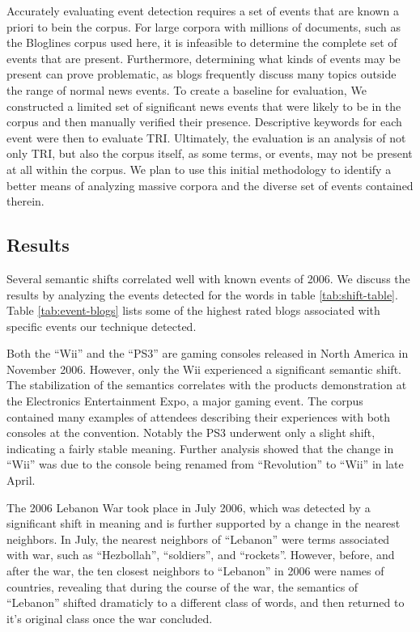 \documentclass[a4paper,twocolumn,twoside,10pt]{ranlp}
\begin{document}
Accurately evaluating event detection requires a set of events that are known a
priori to bein the corpus.  For large corpora with millions of documents, such
as the Bloglines corpus used here, it is infeasible to determine the complete
set of events that are present.  Furthermore, determining what kinds of events
may be present can prove problematic, as blogs frequently discuss many topics
outside the range of normal news events.  To create a baseline for evaluation,
We constructed a limited set of significant news events that were likely to be
in the corpus and then manually verified their presence.  Descriptive keywords
for each event were then to evaluate TRI.  Ultimately, the evaluation is an
analysis of not only TRI, but also the corpus itself, as some terms, or events,
may not be present at all within the corpus.  We plan to use this initial
methodology to identify a better means of analyzing massive corpora and
the diverse set of events contained therein.


\subsection{Results}

Several semantic shifts correlated well with known events of 2006.  We discuss
the results by analyzing the events detected for the words in table
\ref{tab:shift-table}.  Table \ref{tab:event-blogs} lists some of the highest
rated blogs associated with specific events our technique detected.

Both the ``Wii'' and the ``PS3'' are gaming consoles released in North America
in November 2006.  However, only the Wii experienced a significant semantic shift.
The stabilization of the semantics correlates with the products demonstration at
the Electronics Entertainment Expo, a major gaming event.  The corpus contained
many examples of attendees describing their experiences with both consoles at
the convention.  Notably the PS3 underwent only a slight shift, indicating 
a fairly stable meaning.  Further analysis showed that the change in ``Wii'' was
due to the console being renamed from ``Revolution'' to ``Wii'' in late April.

The 2006 Lebanon War took place in July 2006, which was detected by a
significant shift in meaning and is further supported by a change in the 
nearest neighbors.  In July, the nearest neighbors of ``Lebanon'' were terms
associated with war, such as ``Hezbollah'', ``soldiers'', and
``rockets''.  However, before, and after the war, the ten closest neighbors to
``Lebanon'' in 2006 were names of countries, revealing that during the course of
the war, the semantics of ``Lebanon'' shifted dramaticly to a different class of
words, and then returned to it's original class once the war concluded.
\end{document}

